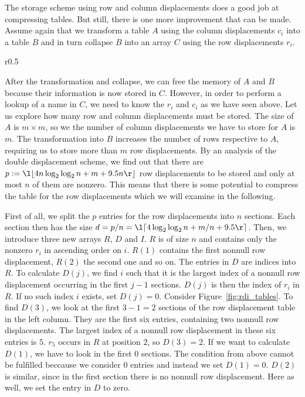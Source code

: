 The storage scheme using row and column displacements does a good job at compressing tables.
But still, there is one more improvement that can be made.
Assume again that we transform a table $A$ using the column displacements $c_i$ into a table $B$ and in turn collapse $B$ into an array $C$ using the row displacements $r_i$.
%
\begin{wrapfigure}{r}{0.5\textwidth}
	\centering
	
	\caption{\small Row displacement directory for $p = 12, n = 4$, $d = 3$ with the arrays $R, D$ and $I$. $D$ indexes into $R$, $I$ contains offsets for the indices in $D$. \label{fig:rdi_tables}}
\end{wrapfigure}
%
After the transformation and collapse, we can free the memory of $A$ and $B$ because their information is now stored in $C$.
However, in order to perform a lookup of a name in $C$, we need to know the $r_i$ and $c_i$ as we have seen above.
Let us explore how many row and column displacements must be stored.
The size of $A$ is $m \times m$, so we the number of column displacements we have to store for $A$ is $m$.
The transformation into $B$ increases the number of rows respective to $A$, requiring us to store more than $m$ row displacements.
By an analysis of the double displacement scheme, we find out that there are
$p := \l\lfloor 4 n \log_2 \log_2 n + m + 9.5 n \r\rfloor$ row displacements to be stored and only at most $n$ of them are nonzero.
This means that there is some potential to compress the table for the row displacements which we will examine in the following.

First of all, we split the $p$ entries for the row displacements into $n$ sections.
Each section then has the size $d = p/n = \l\lceil 4 \log_2 \log_2 n + m/n + 9.5 \r\rceil$.
Then, we introduce three new arrays $R$, $D$ and $I$.
$R$ is of size $n$ and contains only the nonzero $r_i$ in ascending order on $i$.
$R(1)$ contains the first nonnull row displacement, $R(2)$ the second one and so on.
The entries in $D$ are indices into $R$.
To calculate $D(j)$, we find $i$ such that it is the largest index of a nonnull row displacement occurring in the first $j - 1$ sections.
$D(j)$ is then the index of $r_i$ in $R$.
If no such index $i$ exists, set $D(j) = 0$.
Consider Figure~\ref{fig:rdi_tables}.
To find $D(3)$, we look at the first $3 - 1 = 2$ sections of the row displacement table in the left column.
They are the first six entries, containing two nonnull row displacements.
The largest index of a nonnull row displacement in these six entries is $5$.
$r_5$ occurs in $R$ at position $2$, so $D(3) = 2$.
If we want to calculate $D(1)$, we have to look in the first $0$ sections.
The condition from above cannot be fulfilled beccause we consider 0 entries and instead we set $D(1) = 0$.
$D(2)$ is similar, since in the first section there is no nonnull row displacement.
Here as well, we set the entry in $D$ to zero.

